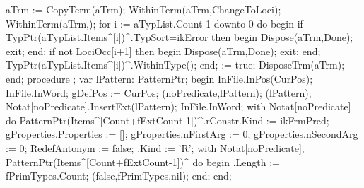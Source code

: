    aTrm := CopyTerm(aTrm);
   WithinTerm(aTrm,ChangeToLoci);
   WithinTerm(aTrm,);
   for i := aTypList.Count-1 downto 0 do
   begin
      if TypPtr(aTypList.Items^[i])^.TypSort=ikError then
      begin
         Dispose(aTrm,Done);
         exit;
      end;
      if not LociOcc[i+1] then
      begin
         Dispose(aTrm,Done);
         exit;
      end;
      TypPtr(aTypList.Items^[i])^.WithinType();
   end;
    := true;
   DisposeTrm(aTrm);
end;
\eatline
{}\nwendcode{}\nwdocspar
\nwenddocs{}\endmoddef\nwstartdeflinemarkup{}\nwenddeflinemarkup
procedure ;
var
   lPattern: PatternPtr;
begin
   InFile.InPos(CurPos);
   InFile.InWord;
   gDefPos := CurPos;
   (noPredicate,lPattern);
   (lPattern);
   Notat[noPredicate].InsertExt(lPattern);
   InFile.InWord;
   with Notat[noPredicate] do
      PatternPtr(Items^[Count+fExtCount-1])^.rConstr.Kind := ikFrmPred;
   gProperties.Properties := [];
   gProperties.nFirstArg := 0;
   gProperties.nSecondArg := 0;
   RedefAntonym := false;
   .Kind := 'R';
   with Notat[noPredicate], PatternPtr(Items^[Count+fExtCount-1])^ do
   begin
      .Length := fPrimTypes.Count;
      (false,fPrimTypes,nil);
   end;
end;
\eatline
{}\nwendcode{}\nwdocspar
